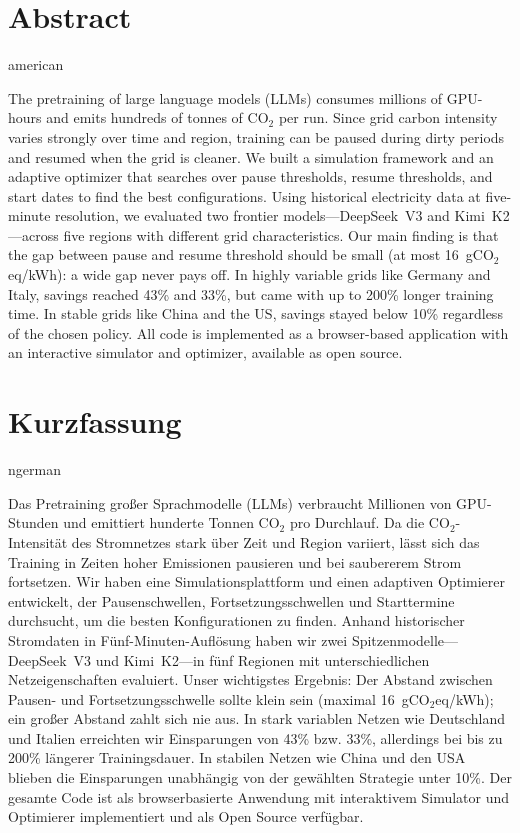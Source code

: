 
\chapter*{Abstract}
\begin{otherlanguage*}{american}

The pretraining of large language models (LLMs) consumes millions of GPU-hours
and emits hundreds of tonnes of CO$_2$ per run.  Since grid carbon intensity
varies strongly over time and region, training can be paused during dirty
periods and resumed when the grid is cleaner.  We built a simulation framework
and an adaptive optimizer that searches over pause thresholds, resume
thresholds, and start dates to find the best configurations.  Using historical
electricity data at five-minute resolution, we evaluated two frontier
models---DeepSeek~V3 and Kimi~K2---across five regions with different grid
characteristics.  Our main finding is that the gap between pause and resume
threshold should be small (at most 16~gCO$_2$eq/kWh): a wide gap never pays
off.  In highly variable grids like Germany and Italy, savings reached 43\%
and 33\%, but came with up to 200\% longer training time.  In stable grids
like China and the US, savings stayed below 10\% regardless of the chosen
policy.  All code is implemented as a browser-based application with an
interactive simulator and optimizer, available as open source.

\end{otherlanguage*}

\chapter*{Kurzfassung}
\begin{otherlanguage*}{ngerman}

Das Pretraining gro{\ss}er Sprachmodelle (LLMs) verbraucht Millionen von
GPU-Stunden und emittiert hunderte Tonnen CO$_2$ pro Durchlauf.  Da die
CO$_2$-Intensit\"at des Stromnetzes stark \"uber Zeit und Region variiert,
l\"asst sich das Training in Zeiten hoher Emissionen pausieren und bei
saubererem Strom fortsetzen.  Wir haben eine Simulationsplattform und einen
adaptiven Optimierer entwickelt, der Pausenschwellen,
Fortsetzungsschwellen und Starttermine durchsucht, um die besten
Konfigurationen zu finden.  Anhand historischer Stromdaten in
F\"unf-Minuten-Aufl\"osung haben wir zwei Spitzenmodelle---DeepSeek~V3 und
Kimi~K2---in f\"unf Regionen mit unterschiedlichen Netzeigenschaften
evaluiert.  Unser wichtigstes Ergebnis: Der Abstand zwischen Pausen- und
Fortsetzungsschwelle sollte klein sein (maximal 16~gCO$_2$eq/kWh); ein gro{\ss}er
Abstand zahlt sich nie aus.  In stark variablen Netzen wie Deutschland und
Italien erreichten wir Einsparungen von 43\% bzw. 33\%, allerdings bei bis zu
200\% l\"angerer Trainingsdauer.  In stabilen Netzen wie China und den USA
blieben die Einsparungen unabh\"angig von der gew\"ahlten Strategie unter
10\%.  Der gesamte Code ist als browserbasierte Anwendung mit interaktivem
Simulator und Optimierer implementiert und als Open Source verf\"ugbar.

\end{otherlanguage*}
